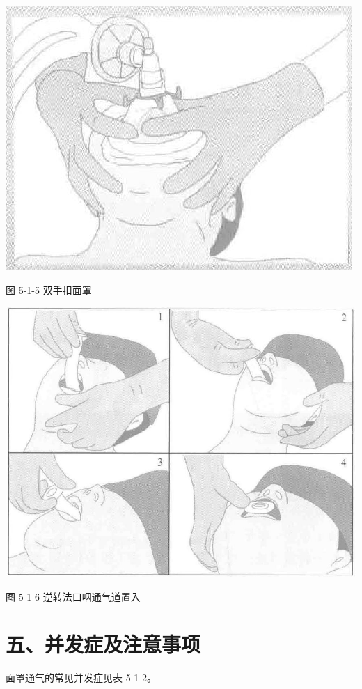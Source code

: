 \documentclass[10pt]{article}
\begin{document}
\begin{center}
\includegraphics[max width=\textwidth]{2024_07_05_645bb794a4d4f32ee0c8g-285(1)}
\end{center}

图 5-1-5 双手扣面罩

\begin{center}
\includegraphics[max width=\textwidth]{2024_07_05_645bb794a4d4f32ee0c8g-286}
\end{center}

图 5-1-6 逆转法口咽通气道置入

\section*{五、并发症及注意事项}
面罩通气的常见并发症见表 5-1-2。
\end{document}
